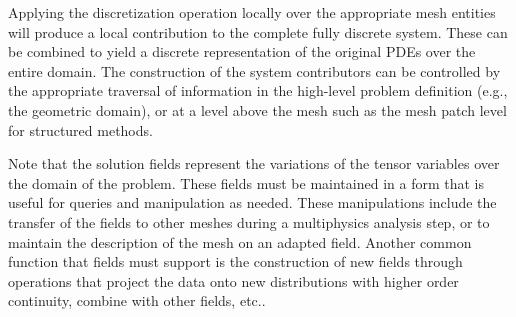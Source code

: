Applying the discretization operation locally over the appropriate mesh
entities will produce a local contribution to the complete fully
discrete system.
These can be combined to yield a discrete representation of the original
PDEs over the entire domain.
The construction of the system contributors can be controlled by the
appropriate traversal of information in the high-level problem
definition (e.g., the geometric domain), or at a level above the mesh
such as the mesh patch level for structured methods.

Note that the solution fields represent the variations of the tensor
variables over the domain of the problem. These fields
must be maintained in a form that is useful for queries
and manipulation as needed.  These manipulations include
the transfer of the fields to other meshes during a 
multiphysics analysis step, or to maintain the description
of the mesh on an adapted field.  Another common function that fields must
support is the construction of new fields through operations
that project the data onto new distributions with higher order
continuity, combine with other fields, etc..

